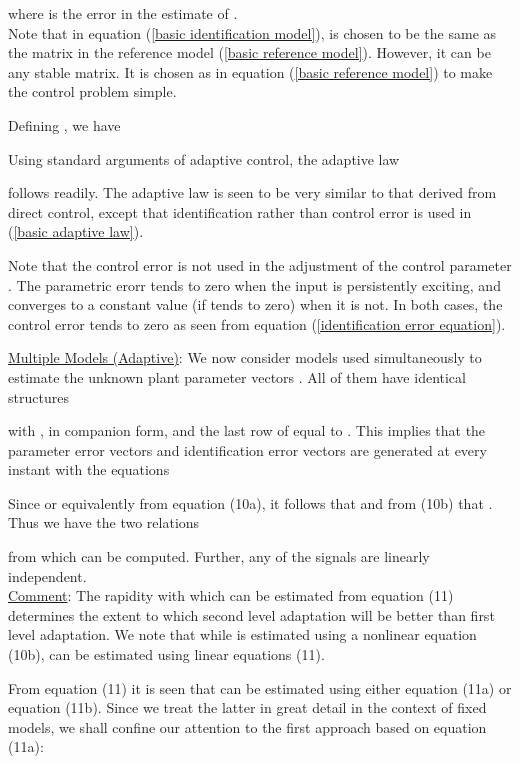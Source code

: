 \documentclass[conference]{IEEEtran}
\begin{document}
where  is the error in the estimate of .\\

Note that in equation (\ref{basic identification model}),  is chosen to be the same as the matrix in the reference model (\ref{basic reference model}). However, it can be any stable matrix. It is chosen as in equation (\ref{basic reference model}) to make the control problem simple.


Defining , we have

Using standard arguments of adaptive control, the adaptive law

follows readily. The adaptive law is seen to be very similar to that derived from direct control, except that identification rather than control error is used in (\ref{basic adaptive law}).

Note that the control error is not used in the adjustment of the control parameter . The parametric erorr   tends to zero when the input  is persistently exciting, and converges to a constant value (if  tends to zero) when it is not. In both cases, the control error tends to zero as seen from equation (\ref{identification error equation}).

{\large \underline{Multiple Models (Adaptive)}}: We now consider  models used simultaneously to estimate the unknown plant parameter vectors . All of them have identical structures

with ,  in companion form, and the last row of  equal to . This implies that the  parameter error vectors  and identification error vectors  are generated at every instant with the equations

Since  or equivalently  from equation (10a), it follows that  and from (10b) that . Thus we have the two relations

from which  can be computed. Further, any  of the  signals  are linearly independent.\\
{\large \underline{Comment}}: The rapidity with which  can be estimated from equation (11)  determines the extent to which second level adaptation will be better than first level adaptation. We note that while  is estimated using a nonlinear equation (10b),  can be estimated using linear equations (11).

From equation (11) it is seen that  can be estimated using either equation (11a) or equation (11b). Since we treat the latter in great detail in the context of fixed models, we shall confine our attention to the first approach based on equation (11a):
\end{document}

